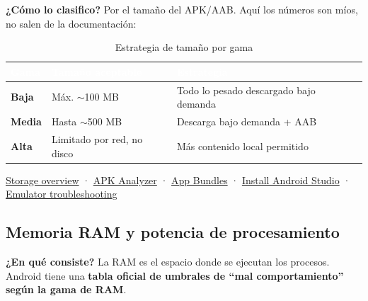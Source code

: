\documentclass[11pt,a4paper]{article}
\newcommand{\campo}[1]{\textbf{\color{primary}#1}}
\begin{document}
	\campo{¿Cómo lo clasifico?} Por el tamaño del APK/AAB. Aquí los números son míos, no salen de la documentación:
	
	\begin{table}[htbp]
		\centering
		\small
		\begin{tabularx}{\textwidth}{@{}l l >{\RaggedRight\arraybackslash}X@{}}
			\toprule
			\rowcolor{primary}
			\textcolor{white}{\sffamily\bfseries Gama} & \textcolor{white}{\sffamily\bfseries Tamaño aceptable} & \textcolor{white}{\sffamily\bfseries Estrategia} \\
			\midrule
			\textbf{Baja} & Máx. $\sim$100 MB & Todo lo pesado descargado bajo demanda \\
			\rowcolor{soft}
			\textbf{Media} & Hasta $\sim$500 MB & Descarga bajo demanda + AAB \\
			\textbf{Alta} & Limitado por red, no disco & Más contenido local permitido \\
			\bottomrule
		\end{tabularx}
		\caption{Estrategia de tamaño por gama}
	\end{table}
	
	\begin{fuentesbox}
		\href{https://developer.android.com/training/data-storage}{Storage overview} ·
		\href{https://developer.android.com/studio/debug/apk-analyzer}{APK Analyzer} ·
		\href{https://developer.android.com/guide/app-bundle/dynamic-delivery}{App Bundles} ·
		\href{https://developer.android.com/studio/install}{Install Android Studio} ·
		\href{https://developer.android.com/studio/run/emulator-troubleshooting}{Emulator troubleshooting}
	\end{fuentesbox}
	
	\subsection{Memoria RAM y potencia de procesamiento}
	
	\campo{¿En qué consiste?}
	La RAM es el espacio donde se ejecutan los procesos. Android tiene una \textbf{tabla oficial de umbrales de \enquote{mal comportamiento} según la gama de RAM}.
	
\end{document}
